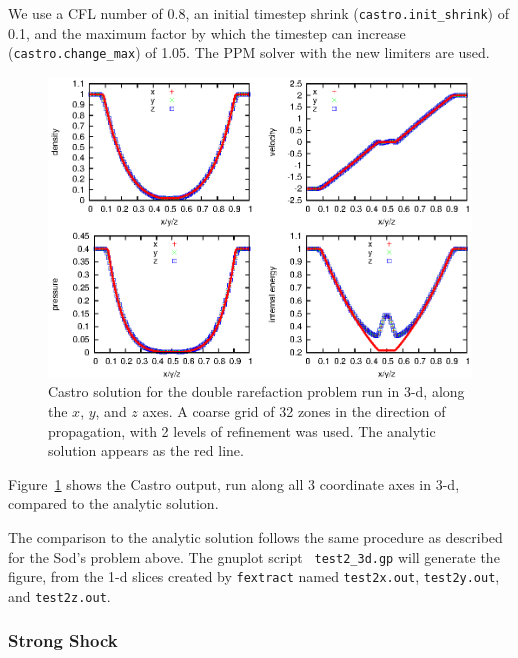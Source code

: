 We use a CFL number of 0.8, an initial
timestep shrink ({\tt castro.init\_shrink}) of 0.1, and the maximum factor by which
the timestep can increase ({\tt castro.change\_max}) of 1.05.  The PPM
solver with the new limiters are used.
\begin{figure}[h]
\centering
\includegraphics[width=5.0in]{CastroVerification/test2_3d}
\caption{\label{fig:test2} Castro solution for the double rarefaction
  problem run in 3-d, along the $x$, $y$, and $z$ axes.  A coarse grid
  of 32 zones in the direction of propagation, with 2 levels of
  refinement was used.  The analytic solution appears as the red
  line.}
\end{figure}

Figure~\ref{fig:test2} shows the Castro output, run along all 3
coordinate axes in 3-d, compared to the analytic solution.  

The comparison to the analytic solution follows the same procedure as
described for the Sod's problem above.  The gnuplot script {\tt
  test2\_3d.gp} will generate the figure, from the 1-d slices created by
{\tt fextract} named {\tt test2x.out}, {\tt test2y.out}, and {\tt test2z.out}.

\subsubsection{Strong Shock}

